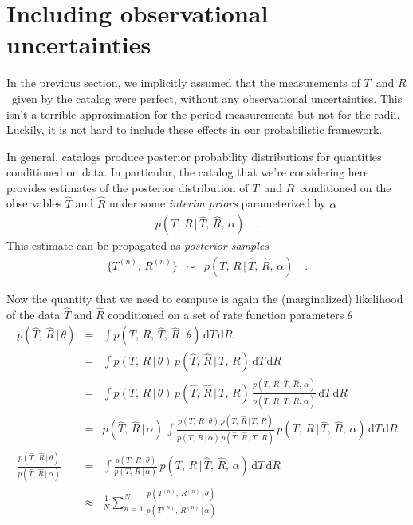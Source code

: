 \documentclass[12pt,preprint]{aastex}
\newcommand{\dd}{\ensuremath{\,\mathrm{d}}}
\newcommand{\ratepars}{\ensuremath{\theta}}
\newcommand{\obs}[1]{\ensuremath{\hat{#1}}}
\newcommand{\radius}{\ensuremath{R}}
\newcommand{\period}{\ensuremath{T}}
\newcommand{\interim}{\ensuremath{\alpha}}
\begin{document}
\section{Including observational uncertainties}

In the previous section, we implicitly assumed that the measurements of
\period\ and \radius\ given by the catalog were perfect, without any
observational uncertainties.
This isn't a terrible approximation for the period measurements but not for
the radii.
Luckily, it is not hard to include these effects in our probabilistic
framework.

In general, catalogs produce posterior probability distributions for
quantities conditioned on data.
In particular, the catalog that we're considering here provides estimates of
the posterior distribution of \period\ and \radius\ conditioned on the
observables $\obs{\period}$ and $\obs{\radius}$ under some \emph{interim
priors} parameterized by \interim
\begin{eqnarray}
p(\period,\,\radius\,|\,\obs{\period},\,\obs{\radius},\,\interim) \quad.
\end{eqnarray}
This estimate can be propagated as \emph{posterior samples}
\begin{eqnarray}
\{\period^{(n)},\,\radius^{(n)}\} &\sim&
p(\period,\,\radius\,|\,\obs{\period},\,\obs{\radius},\,\interim) \quad.
\end{eqnarray}

Now the quantity that we need to compute is again the (marginalized)
likelihood of the data $\obs{\period}$ and $\obs{\radius}$ conditioned on a
set of rate function parameters \ratepars
\begin{eqnarray}
p(\obs{\period},\,\obs{\radius}\,|\,\ratepars) &=&
\int p(\period,\,\radius,\,\obs{\period},\,\obs{\radius}\,|\,\ratepars)
\dd\period\dd\radius \\
&=&
\int p(\period,\,\radius\,|\,\ratepars) \,
p(\obs{\period},\,\obs{\radius}\,|\,\period,\,\radius)
\dd\period\dd\radius \\
&=&
\int p(\period,\,\radius\,|\,\ratepars) \,
p(\obs{\period},\,\obs{\radius}\,|\,\period,\,\radius)\,
\frac{p(\period,\,\radius\,|\,\obs{\period},\,\obs{\radius},\,\interim)}
     {p(\period,\,\radius\,|\,\obs{\period},\,\obs{\radius},\,\interim)}
\dd\period\dd\radius \\
&=&
p(\obs{\period},\,\obs{\radius}\,|\,\interim)\,
\int
\frac{p(\period,\,\radius\,|\,\ratepars) \,
      p(\obs{\period},\,\obs{\radius}\,|\,\period,\,\radius)}
     {p(\period,\,\radius\,|\,\interim) \,
      p(\obs{\period},\,\obs{\radius}\,|\,\period,\,\radius)}\,
p(\period,\,\radius\,|\,\obs{\period},\,\obs{\radius},\,\interim)
\dd\period\dd\radius \\
\frac{p(\obs{\period},\,\obs{\radius}\,|\,\ratepars)}
     {p(\obs{\period},\,\obs{\radius}\,|\,\interim)}
&=&
\int
\frac{p(\period,\,\radius\,|\,\ratepars)}
     {p(\period,\,\radius\,|\,\interim)} \,
p(\period,\,\radius\,|\,\obs{\period},\,\obs{\radius},\,\interim)
\dd\period\dd\radius \\
&\approx&
\frac{1}{N}
\sum_{n=1}^N
\frac{p(\period^{(n)},\,\radius^{(n)}\,|\,\ratepars)}
     {p(\period^{(n)},\,\radius^{(n)}\,|\,\interim)}
\end{eqnarray}
\end{document}
